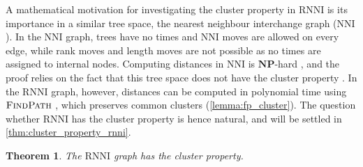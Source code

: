 \documentclass[11pt]{amsart}
\newtheorem{theorem}{Theorem}
\newcommand{\rnni}{\mathrm{RNNI}}
\newcommand{\findpath}{\textsc{FindPath}}
\newcommand{\nni}{\mathrm{NNI}}
\newcommand{\np}{\mathbf{NP}}
\newcommand{\summary}[1]{} %
\begin{document}
\summary{Cluster property in $\nni$ and its connection to the complexity result.}
A mathematical motivation for investigating the cluster property in $\rnni$ is its importance in a similar tree space, the nearest neighbour interchange graph ($\nni$).
In the $\nni$ graph, trees have no times and $\nni$ moves are allowed on every edge, while rank moves and length moves are not possible as no times are assigned to internal nodes.
Computing distances in $\nni$ is $\np$-hard \autocite{Dasgupta2000-xa}, and the proof relies on the fact that this tree space does not have the cluster property \autocite{Li1996-zw}.
In the $\rnni$ graph, however, distances can be computed in polynomial time using $\findpath$ \autocite{Collienne2021}, which preserves common clusters (\autoref{lemma:fp_cluster}).
The question whether $\rnni$ has the cluster property is hence natural, and will be settled in \autoref{thm:cluster_property_rnni}.


\summary{$\rnni$ has the cluster property.}
\begin{theorem}
	The $\rnni$ graph has the cluster property.
	\label{thm:cluster_property_rnni}
\end{theorem}
\end{document}
